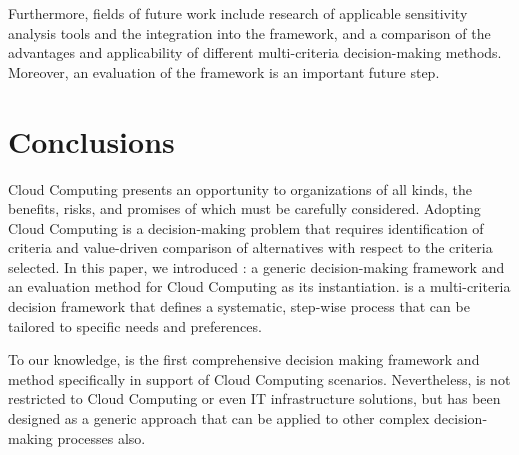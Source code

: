 \documentclass[journal,final,a4paper,twoside]{IEEEtran}
\begin{document}
Furthermore, fields of future work include research of applicable sensitivity analysis tools and the integration into the  framework, and a comparison of the advantages and applicability of different multi-criteria decision-making methods. Moreover, an evaluation of the framework is an important future step.

\section{Conclusions}
\label{conclude}
Cloud Computing presents an opportunity to organizations of all kinds, the benefits, risks, and promises of which must be carefully considered. Adopting Cloud Computing is a decision-making problem that requires identification of criteria and value-driven comparison of alternatives with respect to the criteria selected.
In this paper, we introduced : a generic decision-making framework and an evaluation method for Cloud Computing as its instantiation.  is a multi-criteria decision framework that defines a systematic, step-wise process that can be tailored to specific needs and preferences.

To our knowledge,  is the first comprehensive decision making framework and method specifically in support of Cloud Computing scenarios. Nevertheless,  is not restricted to Cloud Computing or even IT infrastructure solutions, but has been designed as a generic approach that can be applied to other complex decision-making processes also.





















\ifCLASSOPTIONcaptionsoff
  \newpage
\fi









\end{document}

